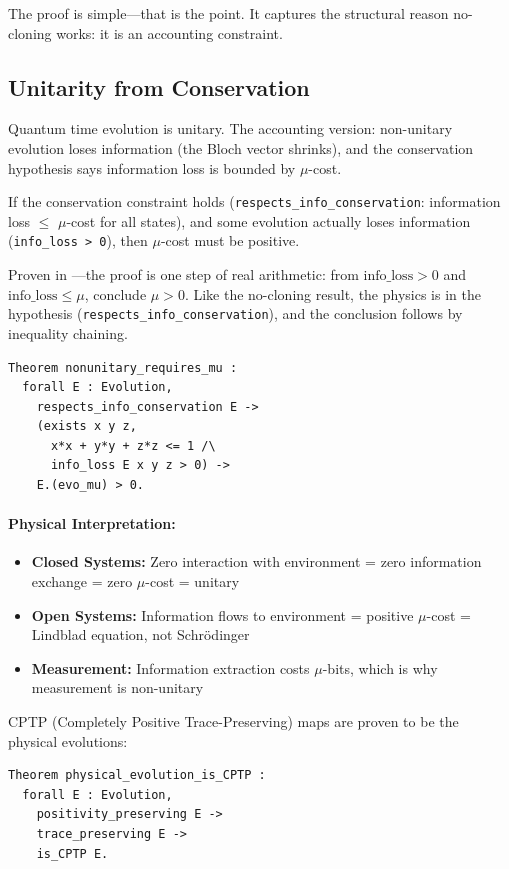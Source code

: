 The proof is simple---that is the point. It captures the structural reason no-cloning works: it is an accounting constraint.

\subsection{Unitarity from Conservation}

Quantum time evolution is unitary. The accounting version: non-unitary evolution loses information (the Bloch vector shrinks), and the conservation hypothesis says information loss is bounded by $\mu$-cost.

\begin{theorem}
If the conservation constraint holds (\texttt{respects\_info\_conservation}: information loss $\leq$ $\mu$-cost for all states), and some evolution actually loses information (\texttt{info\_loss > 0}), then $\mu$-cost must be positive.
\end{theorem}

Proven in ---the proof is one step of real arithmetic: from $\text{info\_loss} > 0$ and $\text{info\_loss} \leq \mu$, conclude $\mu > 0$. Like the no-cloning result, the physics is in the hypothesis (\texttt{respects\_info\_conservation}), and the conclusion follows by inequality chaining.
\begin{lstlisting}
Theorem nonunitary_requires_mu :
  forall E : Evolution,
    respects_info_conservation E ->
    (exists x y z,
      x*x + y*y + z*z <= 1 /\
      info_loss E x y z > 0) ->
    E.(evo_mu) > 0.
\end{lstlisting}

\paragraph{Physical Interpretation:}
\begin{itemize}
    \item \textbf{Closed Systems:} Zero interaction with environment = zero information exchange = zero $\mu$-cost = unitary
    \item \textbf{Open Systems:} Information flows to environment = positive $\mu$-cost = Lindblad equation, not Schr\"odinger
    \item \textbf{Measurement:} Information extraction costs $\mu$-bits, which is why measurement is non-unitary
\end{itemize}

CPTP (Completely Positive Trace-Preserving) maps are proven to be the physical evolutions:
\begin{lstlisting}
Theorem physical_evolution_is_CPTP :
  forall E : Evolution,
    positivity_preserving E ->
    trace_preserving E ->
    is_CPTP E.
\end{lstlisting}

